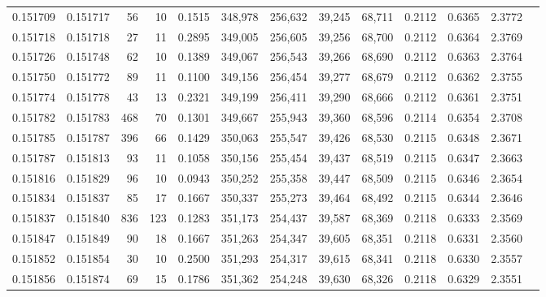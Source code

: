 \begin{tabular}{rrrrrrrrrrrrr}
0.151709 & 0.151717 &    56 &  10 &                                     0.1515 & 348,978 & 256,632 &  39,245 &  68,711 & 0.2112 & 0.6365 & 2.3772 \\
0.151718 & 0.151718 &    27 &  11 &                                     0.2895 & 349,005 & 256,605 &  39,256 &  68,700 & 0.2112 & 0.6364 & 2.3769 \\
0.151726 & 0.151748 &    62 &  10 &                                     0.1389 & 349,067 & 256,543 &  39,266 &  68,690 & 0.2112 & 0.6363 & 2.3764 \\
0.151750 & 0.151772 &    89 &  11 &                                     0.1100 & 349,156 & 256,454 &  39,277 &  68,679 & 0.2112 & 0.6362 & 2.3755 \\
0.151774 & 0.151778 &    43 &  13 &                                     0.2321 & 349,199 & 256,411 &  39,290 &  68,666 & 0.2112 & 0.6361 & 2.3751 \\
0.151782 & 0.151783 &   468 &  70 &                                     0.1301 & 349,667 & 255,943 &  39,360 &  68,596 & 0.2114 & 0.6354 & 2.3708 \\
0.151785 & 0.151787 &   396 &  66 &                                     0.1429 & 350,063 & 255,547 &  39,426 &  68,530 & 0.2115 & 0.6348 & 2.3671 \\
0.151787 & 0.151813 &    93 &  11 &                                     0.1058 & 350,156 & 255,454 &  39,437 &  68,519 & 0.2115 & 0.6347 & 2.3663 \\
0.151816 & 0.151829 &    96 &  10 &                                     0.0943 & 350,252 & 255,358 &  39,447 &  68,509 & 0.2115 & 0.6346 & 2.3654 \\
0.151834 & 0.151837 &    85 &  17 &                                     0.1667 & 350,337 & 255,273 &  39,464 &  68,492 & 0.2115 & 0.6344 & 2.3646 \\
0.151837 & 0.151840 &   836 & 123 &                                     0.1283 & 351,173 & 254,437 &  39,587 &  68,369 & 0.2118 & 0.6333 & 2.3569 \\
0.151847 & 0.151849 &    90 &  18 &                                     0.1667 & 351,263 & 254,347 &  39,605 &  68,351 & 0.2118 & 0.6331 & 2.3560 \\
0.151852 & 0.151854 &    30 &  10 &                                     0.2500 & 351,293 & 254,317 &  39,615 &  68,341 & 0.2118 & 0.6330 & 2.3557 \\
0.151856 & 0.151874 &    69 &  15 &                                     0.1786 & 351,362 & 254,248 &  39,630 &  68,326 & 0.2118 & 0.6329 & 2.3551 \\

\end{tabular}

